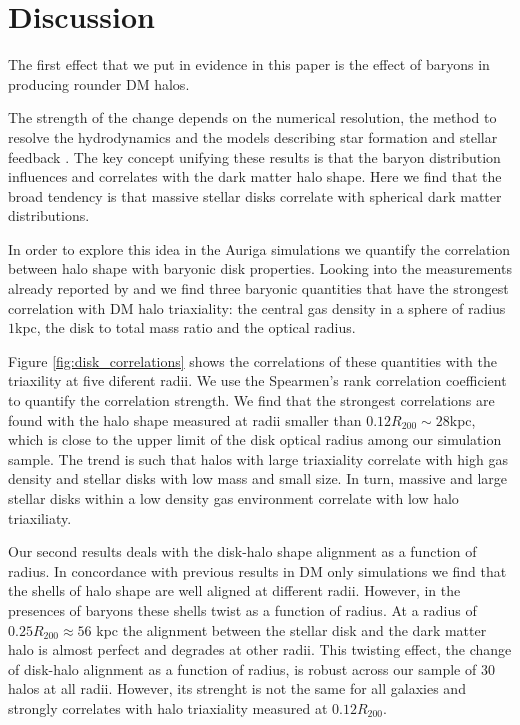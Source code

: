 \documentclass[a4paper,fleqn,usenatbib]{mnras}
\begin{document}
\section{Discussion}
\label{sec:discussion}

The first effect that we put in evidence in this paper is the effect
of baryons in producing rounder DM halos.

The strength of the change depends on the numerical resolution, the
method to resolve the hydrodynamics and the models describing star
formation and stellar feedback \citep{Debattista08, Bryan13, Butsky16,
  Chua19, Artale19}.  
The key concept unifying these results is that the baryon distribution
influences and correlates with the dark matter halo shape. 
Here we find that the broad tendency is that massive stellar disks
correlate with spherical dark matter distributions. 

In order to explore this idea in the Auriga simulations we quantify
the correlation between halo shape with baryonic disk properties. 
Looking into the measurements already reported by \cite{auriga} and
\cite{Pakmor17} we find three baryonic quantities that have the
strongest correlation with DM halo triaxiality: the central gas
density in a sphere of radius $1$kpc, the disk to total mass ratio and
the optical radius.

Figure \ref{fig:disk_correlations} shows the correlations of
these quantities with the triaxility at five diferent radii.
We use the Spearmen's rank correlation coefficient to quantify the
correlation strength.
We find that the strongest correlations are found with the halo shape
measured at radii smaller than $0.12R_{200}\sim 28$kpc, which 
is close to the upper limit of the disk optical radius among our
simulation sample. 
The trend is such that halos with large triaxiality correlate with
high gas density and stellar disks with low mass and small size.
In turn, massive and large stellar disks within a low density gas
environment correlate with low halo triaxiliaty. 

Our second results deals with the disk-halo shape alignment as a function of
radius. 
In concordance with previous results in DM only simulations we find
that the shells of halo shape are well aligned at different radii.
However, in the presences of baryons these shells twist as a function
of radius.
At a radius of $0.25R_{200}\approx 56$ kpc the alignment between the
stellar disk and the dark matter halo is almost perfect and degrades
at other radii. 
This twisting effect, the change of disk-halo alignment as
a function of radius, is robust across our sample of 30
halos at all radii.
However, its strenght is not the same for all galaxies and strongly
correlates with halo triaxiality measured at $0.12R_{200}$. 
\end{document}
